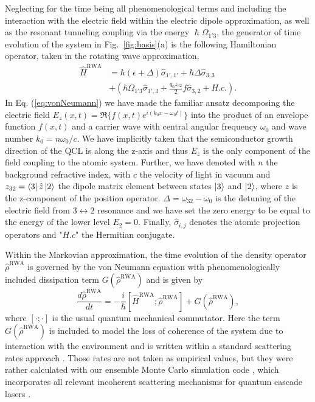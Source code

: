\documentclass[journal]{IEEEtran}
\def\h{\hat}
\begin{document}
	Neglecting for the time being all phenomenological terms and including the interaction with the electric field within the electric dipole approximation, as well as the resonant tunneling coupling via the energy $\hslash\Omega_{1'3}$, the generator of time evolution of the system in Fig.~\ref{fig:basis}(a) is the following Hamiltonian operator, taken in the rotating wave approximation,
	\begin{align}
	\label{eq:hamiltonian-operatorform}
	\h{H}^{\text{RWA}} &= \hbar(\epsilon + \Delta) \h\sigma_{1',1'} +\hbar\Delta\h\sigma_{3,3}  \nonumber \\ &+ (\hbar\Omega_{1'3}\h\sigma_{1',3} +\frac{q_0z_{32}}{2}f \h\sigma_{3,2}+H.c.).
	\end{align}
	In Eq. (\ref{eq:vonNeumann}) we have made the familiar ansatz decomposing the electric field $E_z(x,t) = \Re\{f(x,t) e^{i(k_0x-\omega_0t)}\}$ into the product of an envelope function $f(x,t)$ and a carrier wave with central angular frequency $\omega_0$ and wave number $k_0 = n\omega_0/c$. We have implicitly taken that the semiconductor growth direction of the QCL is along the z-axis and thus $E_z$ is the only component of the field coupling to the atomic system. Further, we have denoted with $n$ the background refractive index, with $c$ the velocity of light in vacuum and $z_{32} = \bra{3}\h{z}\ket{2} $ the dipole matrix element between states $\ket{3}$ and $\ket{2}$, where $\h{z}$ is the z-component of the position operator. $\Delta = \omega_{32} -\omega_0$ is the detuning of the electric field from $3\leftrightarrow 2$ resonance and we have set the zero energy to be equal to the energy of the lower level $E_2 = 0$. Finally, $\h \sigma_{i,j}$ denotes the atomic projection operators and "$H.c$" the Hermitian conjugate.
	
	Within the Markovian approximation, the time evolution of the density operator $\h{\rho}^{\text{RWA}}$ is governed by the von Neumann equation with phenomenologically included dissipation term $G(\h{\rho}^{\text{RWA}})$ and is given by
	\begin{equation}
	\label{eq:vonNeumann}
	\frac{d \h{\rho}^{\text{RWA}}}{dt} = -\frac{i}{\hbar}[\h{H}^{\text{RWA}};\h{\rho}^{\text{RWA}}] + G(\h{\rho}^{\text{RWA}}),
	\end{equation}
	where $[\cdot;\cdot]$ is the usual quantum mechanical commutator. Here the term $G(\h{\rho}^{\text{RWA}})$ is included to model the loss of coherence of the system due to interaction with the environment and is written within a standard scattering rates approach \cite{iotti2005microscopic}. Those rates are not taken as empirical values, but they were rather calculated with our ensemble Monte Carlo simulation code \cite{jirauschek2014modeling}, which incorporates all relevant incoherent scattering mechanisms for quantum cascade lasers \cite{jirauschek2009monte,jirauschek2010monte,jirauschek2014modeling}.
	
\end{document}

